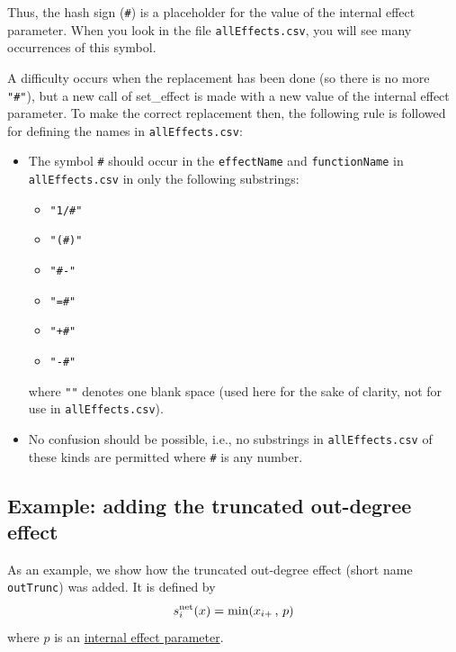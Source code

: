 \documentclass[a4paper,fleqn,11pt]{article}
\newcommand{\+}{\, + \,}
\newcommand{\sfn}[1]{\textsf{#1}}
\begin{document}
Thus, the hash sign  (\texttt{\#}) is a placeholder for the value of
the internal effect parameter.
When you look in the file \texttt{allEffects.csv}, you will see
many occurrences of this symbol.

A difficulty occurs when the replacement has been done
(so there is no more  \texttt{"\#"}), but a new
call of \sfn{set\_effect} is made with a new value of the
internal effect parameter.
To make the correct replacement then, the following rule is followed
for defining the names in \texttt{allEffects.csv}:

\begin{itemize}
\item The symbol \texttt{\#} should occur in the \texttt{effectName}
and \texttt{functionName} in \texttt{allEffects.csv} in only the following substrings:
\begin{itemize}
  \item \texttt{"1/\#"}
  \item \texttt{"(\#)"}
  \item \texttt{"\#-"}
  \item \texttt{"={}\#"}
  \item \texttt{"+{}\#"}
  \item \texttt{"-{}\#"}
\end{itemize}
where \texttt{""} denotes one blank space (used here for the sake
of clarity, not for use in \texttt{allEffects.csv}).
\item No confusion should be possible, i.e.,
        no substrings in \texttt{allEffects.csv}
     of these kinds are permitted where \texttt{\#}  is any number.
\end{itemize}



\subsection{Example: adding the truncated out-degree effect}

As an example, we show how the truncated out-degree effect
(short name \texttt{outTrunc}) was added. It is
 defined by
 \begin{equation}
  s^{\rm net}_{i}(x) = \text{min}(x_{i+}\,,\, p)   \label{outTrunc}
 \end{equation}
where $p$ is an \hyperlink{T_effpar}{internal effect parameter}.
\end{document}
